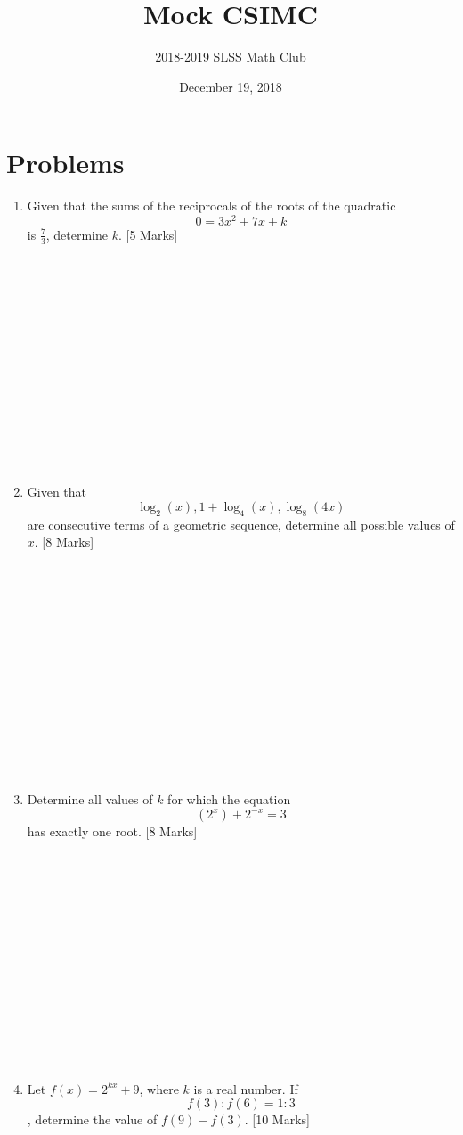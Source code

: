 \documentclass[12pt]{article}
\title{Mock CSIMC\vspace{-3mm}}
\author{2018-2019 SLSS Math Club\vspace{-5mm}}
\date{December 19, 2018\vspace{-5mm}}
\begin{document}
\maketitle

\newcommand{\aSpace}{\\ \\ \\ \\ \\ \\ \\ \\ \\ \\ \\ \\ \\ \\}

\section*{Problems}

\begin{enumerate}
    \item Given that the sums of the reciprocals of the roots of the quadratic $$ 0 = 3x^2 + 7x + k$$ is $\displaystyle{\frac{7}{3}}$, determine $k$. [5 Marks]\aSpace
    
    \item Given that $$\log_2(x), 1 + \log_4(x), \log_8(4x)$$ are consecutive terms of a geometric sequence, determine all possible values of $x$. [8 Marks] \aSpace
    
    \item Determine all values of $k$ for which the equation $$(2^x) + 2^{-x} = 3$$ has exactly one root. [8 Marks]\aSpace
    
    \item Let $f(x) = 2^{kx} + 9$, where $k$ is a real number. If $$f(3):f(6) = 1:3$$, determine the value of $f(9) - f(3)$. [10 Marks]
\end{enumerate}
\end{document}
